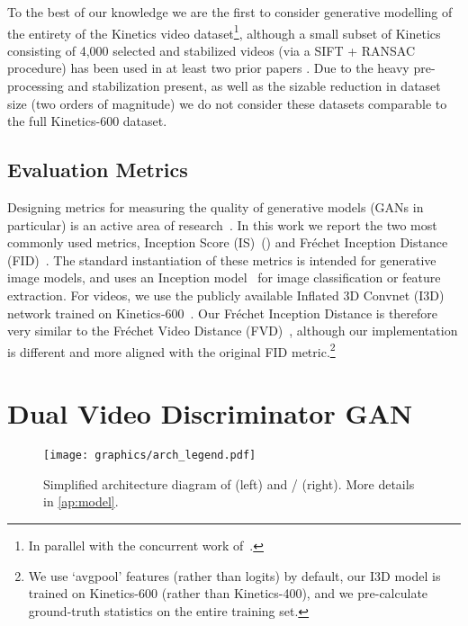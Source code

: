 \documentclass{article} \usepackage{iclr2020_conference,times}
\begin{document}
To the best of our knowledge we are the first to consider generative modelling of the entirety of the Kinetics video dataset\footnote{In parallel with the concurrent work of~\citet{weissenborn2019scaling}.}, although a small subset of Kinetics consisting of 4,000 selected and stabilized videos (via a SIFT + RANSAC procedure) has been used in at least two prior papers \citep{li2018video, balaji2018tfgan}. Due to the heavy pre-processing and stabilization present, as well as the sizable reduction in dataset size (two orders of magnitude) we do not consider these datasets comparable to the full Kinetics-600 dataset.


\subsection{Evaluation Metrics}
\label{ss:metrics}

Designing metrics for measuring the quality of generative models (GANs in particular) is an active area of research~\citep{sajjadi2018assessing,barratt2018note}. In this work we report the two most commonly used metrics, Inception Score (IS)~(\cite{salimans2016improved}) and Fr\'echet Inception Distance (FID)~\citep{heusel2017gans}.
The standard instantiation of these metrics is intended for generative image models, and uses an Inception model~\citep{szegedy2015rethinking} for image classification or feature extraction.
For videos, we use
the publicly available Inflated 3D Convnet (I3D) network trained on Kinetics-600~\citep{carreira2017quo}. 
Our Fr\'echet Inception Distance is therefore very similar to the Fr\'echet Video Distance (FVD)~\citep{unterthiner2018towards},
although our implementation is different and more aligned with the original FID metric.\footnote{We use `avgpool' features (rather than logits) by default, our I3D model is trained on Kinetics-600 (rather than Kinetics-400), and we pre-calculate ground-truth statistics on the entire training set.}

\section{Dual Video Discriminator GAN}
\label{s:dvdgan}

\begin{figure}[t]
\centering
\texttt{[image: graphics/arch\_legend.pdf]}
\vspace{-1em}
\caption{Simplified architecture diagram of  (left) and / (right). More details in \ref{ap:model}.}
\label{fig:diagram}
\end{figure}
\end{document}
